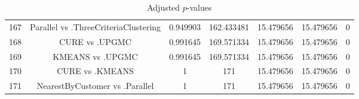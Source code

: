 \documentclass[a4paper,10pt]{article}
\begin{document}
\begin{landscape}
\begin{table}[!htp]
\begin{tabular}{ccccccc}
167&Parallel vs .ThreeCriteriaClustering&0.949903&162.433481&15.479656&15.479656&0\\
168&CURE vs .UPGMC&0.991645&169.571334&15.479656&15.479656&0\\
169&KMEANS vs .UPGMC&0.991645&169.571334&15.479656&15.479656&0\\
170&CURE vs .KMEANS&1&171&15.479656&15.479656&0\\
171&NearestByCustomer vs .Parallel&1&171&15.479656&15.479656&0\\
\hline
\end{tabular}
\caption{Adjusted $p$-values}
\end{table}

\end{landscape}
\end{document}

